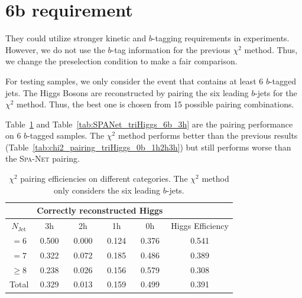 \documentclass[12pt]{article}
\begin{document}
\section{6b requirement}%
\label{sec:6b_requirement}
    They could utilize stronger kinetic and $b$-tagging requirements in experiments. However, we do not use the $b$-tag information for the previous $\chi^2$ method. Thus, we change the preselection condition to make a fair comparison.

    For testing samples, we only consider the event that contains at least 6 $b$-tagged jets. The Higgs Bosons are reconstructed by pairing the six leading $b$-jets for the $\chi^2$ method. Thus, the best one is chosen from 15 possible pairing combinations.

    Table~\ref{tab:chi2_pairing_triHiggs_6b_3h} and Table~\ref{tab:SPANet_triHiggs_6b_3h} are the pairing performance on 6 $b$-tagged samples. The $\chi^2$ method performs better than the previous results (Table~\ref{tab:chi2_pairing_triHiggs_0b_1h2h3h}) but still performs worse than the \textsc{Spa-Net} pairing.
    \begin{table}[htpb]
        \centering
        \caption{$\chi^2$ pairing efficiencies on different categories. The $\chi^2$ method only considers the six leading $b$-jets.}
        \label{tab:chi2_pairing_triHiggs_6b_3h}
        \begin{tabular}{c|cccc|c}
            \multicolumn{1}{l|}{} & \multicolumn{4}{c|}{Correctly reconstructed Higgs} & \multicolumn{1}{l}{} \\ \hline
            $N_\text{Jet}$        & 3h          & 2h         & 1h         & 0h         & Higgs Efficiency     \\ \hline
            $=6$                  & 0.500       & 0.000      & 0.124      & 0.376      & 0.541                \\
            $=7$                  & 0.322       & 0.072      & 0.185      & 0.486      & 0.389                \\
            $\ge 8$               & 0.238       & 0.026      & 0.156      & 0.579      & 0.308                \\ \hline
            Total                 & 0.329       & 0.013      & 0.159      & 0.499      & 0.391
        \end{tabular}
    \end{table}
\end{document}

